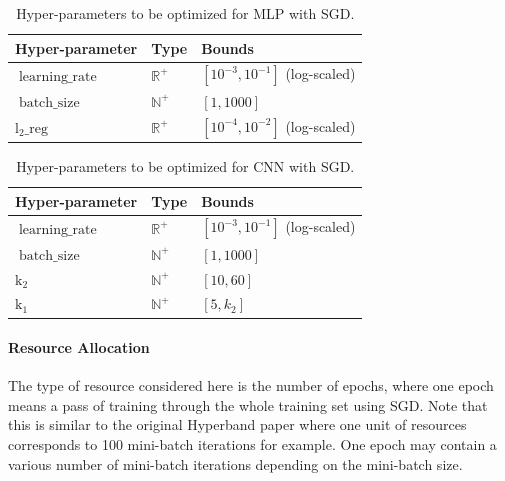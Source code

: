 \documentclass[runningheads,a4paper]{llncs}
\begin{document}
\begin{table}[ht]
\centering
\begin{tabular}{@{}lll@{}}
\toprule
\textbf{Hyper-parameter} & \textbf{Type}                      & \textbf{Bounds}               \\ \midrule
$\operatorname{learning\_rate}$                & $\mathbb{R}^+$ & $\left[ 10^{-3}, 10^{-1} \right]$ (log-scaled) \\
$\operatorname{batch\_size}$           & $\mathbb{N}^+$ & $\left[1, 1000 \right]$         \\ 
$\operatorname{l_2\_reg}$		& $\mathbb{R}^+$ & $\left[ 10^{-4}, 10^{-2} \right]$ (log-scaled) \\ \bottomrule
\end{tabular}
\caption{Hyper-parameters to be optimized for MLP with SGD.}
\label{mlp_sgd}
\end{table}

\begin{table}[ht]
\centering
\begin{tabular}{@{}lll@{}}
\toprule
\textbf{Hyper-parameter} & \textbf{Type}                      & \textbf{Bounds}               \\ \midrule
$\operatorname{learning\_rate}$                & $\mathbb{R}^+$ & $\left[ 10^{-3}, 10^{-1} \right]$ (log-scaled) \\
$\operatorname{batch\_size}$           & $\mathbb{N}^+$ & $\left[1, 1000 \right]$         \\
$\operatorname{k_2}$           & $\mathbb{N}^+$ & $\left[10,  60 \right]$         \\
$\operatorname{k_1}$           & $\mathbb{N}^+$ & $\left[5,  k_2 \right]$         \\ \bottomrule
\end{tabular}
\caption{Hyper-parameters to be optimized for CNN with SGD.}
\label{cnn_sgd}
\end{table}

\paragraph{\textbf{Resource Allocation}} The type of resource considered here is the number of epochs, where one epoch means a pass of training through the whole training set using SGD. Note that this is similar to the original Hyperband paper where one unit of resources corresponds to 100 mini-batch iterations for example. One epoch may contain a various number of mini-batch iterations depending on the mini-batch size.
\end{document}
